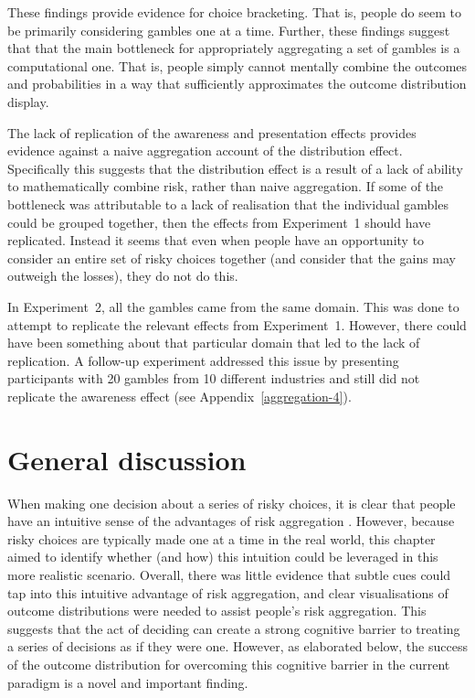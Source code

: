 \documentclass[a4paper, nobind, dvipsnames]{templates/ociamthesis}
\theoremstyle{definition}
\theoremstyle{definition}
\theoremstyle{definition}
\theoremstyle{definition}
\theoremstyle{remark}
\begin{document}
These findings provide evidence for choice bracketing. That is, people do seem
to be primarily considering gambles one at a time. Further, these findings
suggest that that the main bottleneck for appropriately aggregating a set of
gambles is a computational one. That is, people simply cannot mentally combine
the outcomes and probabilities in a way that sufficiently approximates the
outcome distribution display.

The lack of replication of the awareness and presentation effects provides
evidence against a naive aggregation account of the distribution effect.
Specifically this suggests that the distribution effect is a result of a lack of
ability to mathematically combine risk, rather than naive aggregation. If some
of the bottleneck was attributable to a lack of realisation that the individual
gambles could be grouped together, then the effects from Experiment~1 should
have replicated. Instead it seems that even when people have an opportunity to
consider an entire set of risky choices together (and consider that the gains
may outweigh the losses), they do not do this.

In Experiment~2, all the gambles came from the same domain. This was done to
attempt to replicate the relevant effects from Experiment~1. However, there
could have been something about that particular domain that led to the lack of
replication. A follow-up experiment addressed this issue by presenting
participants with 20 gambles from 10 different industries and still did not
replicate the awareness effect (see Appendix~\ref{aggregation-4}).

\section{General discussion}

When making one decision about a series of risky choices, it is clear that
people have an intuitive sense of the advantages of risk aggregation \autocite[e.g.,][]{samuelson1963}. However, because risky choices are typically made one at a time
in the real world, this chapter aimed to identify whether (and how) this
intuition could be leveraged in this more realistic scenario. Overall, there was
little evidence that subtle cues could tap into this intuitive advantage of risk
aggregation, and clear visualisations of outcome distributions were needed to
assist people's risk aggregation. This suggests that the act of deciding can
create a strong cognitive barrier to treating a series of decisions as if they
were one. However, as elaborated below, the success of the outcome distribution
for overcoming this cognitive barrier in the current paradigm is a novel and
important finding.
\end{document}

